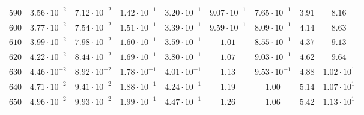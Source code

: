 \begin{landscape}
\begin{table}
\begin{tabular}{lcccccccc}
$	590	$ & $	3.56 \cdot 10^{-2} 	$ & $	7.12 \cdot 10^{-2} 	$ & $	1.42 \cdot 10^{-1} 	$ & $	3.20 \cdot 10^{-1} 	$ & $	9.07 \cdot 10^{-1} 	$ & $	7.65 \cdot 10^{-1} 	$ & $	3.91 	$ & $	8.16 	 $ \\
$	600	$ & $	3.77 \cdot 10^{-2} 	$ & $	7.54 \cdot 10^{-2} 	$ & $	1.51 \cdot 10^{-1} 	$ & $	3.39 \cdot 10^{-1} 	$ & $	9.59 \cdot 10^{-1} 	$ & $	8.09 \cdot 10^{-1} 	$ & $	4.14 	$ & $	8.63 	 $ \\
$	610	$ & $	3.99 \cdot 10^{-2} 	$ & $	7.98 \cdot 10^{-2} 	$ & $	1.60 \cdot 10^{-1} 	$ & $	3.59 \cdot 10^{-1} 	$ & $	1.01 	$ & $	8.55 \cdot 10^{-1} 	$ & $	4.37 	$ & $	9.13 	 $ \\
$	620	$ & $	4.22 \cdot 10^{-2} 	$ & $	8.44 \cdot 10^{-2} 	$ & $	1.69 \cdot 10^{-1} 	$ & $	3.80 \cdot 10^{-1} 	$ & $	1.07 	$ & $	9.03 \cdot 10^{-1} 	$ & $	4.62 	$ & $	9.64 	 $ \\
$	630	$ & $	4.46 \cdot 10^{-2} 	$ & $	8.92 \cdot 10^{-2} 	$ & $	1.78 \cdot 10^{-1} 	$ & $	4.01 \cdot 10^{-1} 	$ & $	1.13 	$ & $	9.53 \cdot 10^{-1} 	$ & $	4.88 	$ & $	1.02 \cdot 10^{1} 	 $ \\
$	640	$ & $	4.71 \cdot 10^{-2} 	$ & $	9.41 \cdot 10^{-2} 	$ & $	1.88 \cdot 10^{-1} 	$ & $	4.24 \cdot 10^{-1} 	$ & $	1.19 	$ & $	1.00 	$ & $	5.14 	$ & $	1.07 \cdot 10^{1} 	 $ \\
$	650	$ & $	4.96 \cdot 10^{-2} 	$ & $	9.93 \cdot 10^{-2} 	$ & $	1.99 \cdot 10^{-1} 	$ & $	4.47 \cdot 10^{-1} 	$ & $	1.26 	$ & $	1.06 	$ & $	5.42 	$ & $	1.13 \cdot 10^{1} 	 $ \\
        \hline
      \end{tabular}
  \end{table}
\end{landscape}


